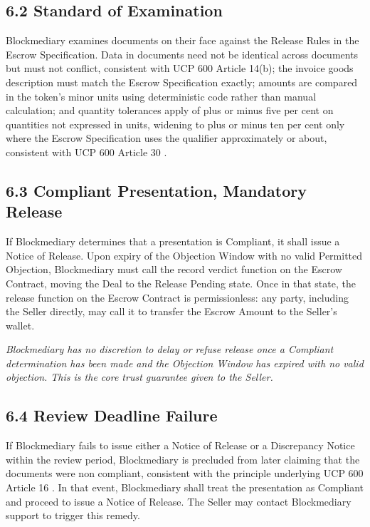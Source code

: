 \documentclass[12pt, a4paper]{article}
\begin{document}
\subsection*{6.2 Standard of Examination}

Blockmediary examines documents on their face against the Release Rules in the Escrow
Specification. Data in documents need not be identical across documents but must not
conflict, consistent with UCP 600 Article 14(b); the invoice goods description must match
the Escrow Specification exactly; amounts are compared in the token's minor units using
deterministic code rather than manual calculation; and quantity tolerances apply of plus
or minus five per cent on quantities not expressed in units, widening to plus or minus ten
per cent only where the Escrow Specification uses the qualifier approximately or about,
consistent with UCP 600 Article 30 \citep{ucp600}.

\subsection*{6.3 Compliant Presentation, Mandatory Release}

If Blockmediary determines that a presentation is Compliant, it shall issue a Notice of
Release. Upon expiry of the Objection Window with no valid Permitted Objection,
Blockmediary must call the record verdict function on the Escrow Contract, moving the Deal
to the Release Pending state. Once in that state, the release function on the Escrow
Contract is permissionless: any party, including the Seller directly, may call it to
transfer the Escrow Amount to the Seller's wallet.

\textit{Blockmediary has no discretion to delay or refuse release once a Compliant
determination has been made and the Objection Window has expired with no valid objection.
This is the core trust guarantee given to the Seller.}

\subsection*{6.4 Review Deadline Failure}

If Blockmediary fails to issue either a Notice of Release or a Discrepancy Notice within
the review period, Blockmediary is precluded from later claiming that the documents were
non compliant, consistent with the principle underlying UCP 600 Article 16 \citep{ucp600}.
In that event, Blockmediary shall treat the presentation as Compliant and proceed to issue
a Notice of Release. The Seller may contact Blockmediary support to trigger this remedy.
\end{document}
